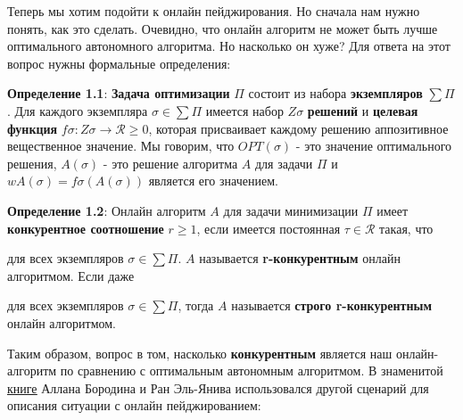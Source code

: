 \vspace{\baselineskip}

Теперь мы хотим подойти к онлайн пейджирования. Но сначала нам нужно понять, как это сделать. Очевидно, что онлайн алгоритм не может быть лучше оптимального автономного алгоритма. Но насколько он хуже? Для ответа на этот вопрос нужны формальные определения:

\vspace{\baselineskip}

\textbf{Определение 1.1}: \textbf{Задача оптимизации} $\Pi$ состоит из набора \textbf{экземпляров} $\sum \Pi$. Для каждого экземпляра $\sigma \in \sum \Pi$ имеется набор $Z\sigma$ \textbf{решений} и \textbf{целевая функция} $f\sigma:Z\sigma\rightarrow\mathcal{R}\geq0$, которая присваивает каждому решению аппозитивное вещественное значение. Мы говорим, что $OPT(\sigma)$ - это значение оптимального решения, $A(\sigma)$ - это решение алгоритма $A$ для задачи $\Pi$ и $wA(\sigma)=f\sigma(A(\sigma))$ является его значением.

\vspace{\baselineskip}

\textbf{Определение 1.2}: Онлайн алгоритм $A$ для задачи минимизации $\Pi$ имеет \textbf{конкурентное соотношение} $r \geq 1$, если имеется постоянная $\tau\in\mathcal{R}$ такая, что

\vspace{\baselineskip}


\vspace{\baselineskip}

для всех экземпляров $\sigma\in\sum\Pi$. $A$ называется \textbf{r-конкурентным} онлайн алгоритмом. Если даже

\vspace{\baselineskip}


\vspace{\baselineskip}

для всех экземпляров $\sigma\in\sum\Pi$, тогда $A$ называется \textbf{строго r-конкурентным} онлайн алгоритмом.

\vspace{\baselineskip}

Таким образом, вопрос в том, насколько \textbf{конкурентным} является наш онлайн-алгоритм по сравнению с оптимальным автономным алгоритмом. В знаменитой \href{http://www.cs.technion.ac.il/~rani/book.html}{\underline{книге}} Аллана Бородина и Ран Эль-Янива использовался другой сценарий для описания ситуации с онлайн пейджированием:

